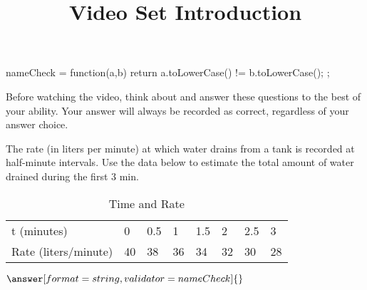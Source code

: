 \documentclass[handout]{ximera}
\title{Video Set Introduction}
\begin{document}
\begin{abstract}
\end{abstract}


\maketitle


\begin{javascript}
  nameCheck = function(a,b) {
    return a.toLowerCase() != b.toLowerCase();
  };
\end{javascript}

Before watching the video, think about and answer these questions to the best of your ability. Your answer will always be recorded as correct, regardless of your answer choice.

\begin{problem}
The rate (in liters per minute) at which water drains from a tank is recorded at half-minute intervals. Use the data below to estimate the total amount of water drained during the first 3 min.

\begin{table}[h!]
\centering
\caption{Time and Rate}
\label{my-label}
\begin{tabular}{|l|l|l|l|l|l|l|l|}
t (minutes)          & 0  & 0.5 & 1  & 1.5 & 2  & 2.5 & 3  \\
Rate (liters/minute) & 40 & 38  & 36 & 34  & 32 & 30  & 28
\end{tabular}
\end{table}

$\answer[format=string,validator=nameCheck]{}$
\end{problem}
\end{document}
